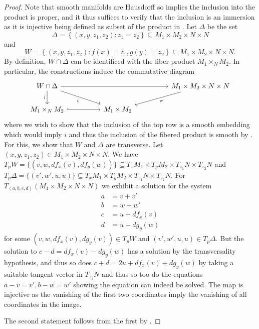 \begin{proof}
    Note that smooth manifolds are Hausdorff so  implies the inclusion into the product is proper, and it thus suffices to verify that the inclusion is an immersion as it is injective being defined as subset of the product in . Let $\Delta$ be the set 
    $$\Delta=\left\{(x,y,z_{1},z_{2}):z_{1}=z_{2}\right\}\subseteq M_{1}\times M_{2}\times N\times N$$
    and 
    $$W=\left\{(x,y,z_{1},z_{2}):f(x)=z_{1},g(y)=z_{2}\right\}\subseteq M_{1}\times M_{2}\times N\times N.$$
    By definition, $W\cap\Delta$ can be identificed with the fiber product $M_{1}\times_{N}M_{2}$. In particular, the constructions induce the commutative diagram 
    $$%
    \begin{tikzcd}
        {W\cap\Delta} &&&& {M_{1}\times M_{2}\times N\times N} \\
        {M_{1}\times_{N}M_{2}} && {M_{1}\times M_{2}}
        \arrow[from=1-1, to=1-5]
        \arrow["\wr"', from=1-1, to=2-1]
        \arrow["i"', from=1-1, to=2-3]
        \arrow["\pi", from=1-5, to=2-3]
        \arrow[hook, from=2-1, to=2-3]
    \end{tikzcd}$$
    where we wish to show that the inclusion of the top row is a smooth embedding which would imply $i$ and thus the inclusion of the fibered product is smooth by . For this, we show that $W$ and $\Delta$ are transverse. Let $(x,y,z_{1},z_{2})\in M_{1}\times M_{2}\times N\times N$. We have $T_{p}W=\{(v,w,df_{x}(v),df_{y}(w))\}\subseteq T_{x}M_{1}\times T_{y}M_{2}\times T_{z_{1}}N\times T_{z_{2}}N$ and $T_{p}\Delta=\{(v',w',u,u)\}\subseteq T_{x}M_{1}\times T_{y}M_{2}\times T_{z_{1}}N\times T_{z_{2}}N$. For $T_{(a,b,c,d)}(M_{1}\times M_{2}\times N\times N)$ we exhibit a solution for the system 
    \begin{align*}
        a &= v + v'\\
        b &= w + w'\\
        c &= u+df_{x}(v) \\
        d &= u+dg_{y}(w)
    \end{align*}
     for some $(v,w,df_{x}(v),dg_{y}(v))\in T_{p}W$ and $(v',w',u,u)\in T_{p}\Delta$. But the solution to $c-d=df_{x}(v)-dg_{y}(w)$ has a solution by the transversality hypothesis, and thus so does $c+d=2u +df_{x}(v)+dg_{y}(w)$ by taking a suitable tangent vector in $T_{z_{1}}N$ and thus so too do the equations $a-v=v',b-w=w'$ showing the equation can indeed be solved. The map is injective as the vanishing of the first two coordinates imply the vanishing of all coordinates in the image. 

    
    The second statement follows from the first by . 
\end{proof}
